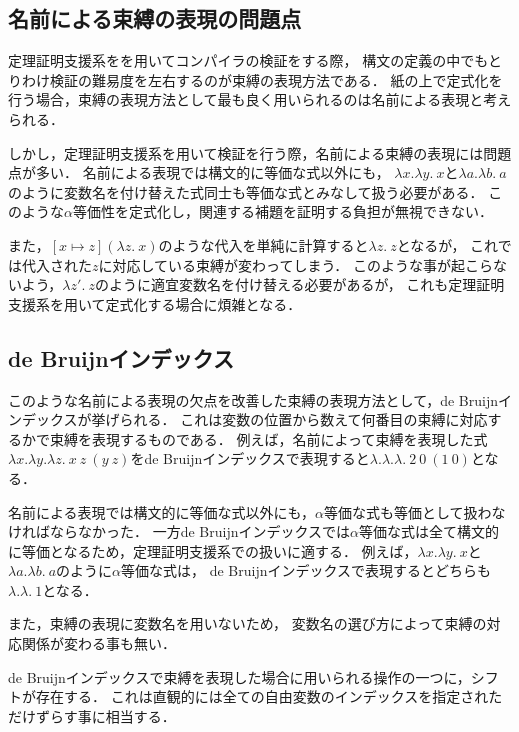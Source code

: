 \documentclass[T]{compsoft}
\begin{document}
\subsection{名前による束縛の表現の問題点}
定理証明支援系をを用いてコンパイラの検証をする際，
構文の定義の中でもとりわけ検証の難易度を左右するのが束縛の表現方法である．
紙の上で定式化を行う場合，束縛の表現方法として最も良く用いられるのは名前による表現と考えられる．

しかし，定理証明支援系を用いて検証を行う際，名前による束縛の表現には問題点が多い．
名前による表現では構文的に等価な式以外にも，
$\lambda x.\lambda y.~x$と$\lambda a.\lambda b.~a$のように変数名を付け替えた式同士も等価な式とみなして扱う必要がある．
このような$\alpha$等価性を定式化し，関連する補題を証明する負担が無視できない．

また，$[x \mapsto z](\lambda z.~x)$のような代入を単純に計算すると$\lambda z.~z$となるが，
これでは代入された$z$に対応している束縛が変わってしまう．
このような事が起こらないよう，$\lambda z'.~z$のように適宜変数名を付け替える必要があるが，
これも定理証明支援系を用いて定式化する場合に煩雑となる．

\subsection{de Bruijnインデックス}
このような名前による表現の欠点を改善した束縛の表現方法として，de Bruijnインデックス\cite{Pierce:TypeSystems}が挙げられる．
これは変数の位置から数えて何番目の束縛に対応するかで束縛を表現するものである．
例えば，名前によって束縛を表現した式$\lambda x. \lambda y. \lambda z.~x~z~(y~z)$をde Bruijnインデックスで表現すると$\lambda. \lambda. \lambda.~2~0~(1~0)$となる．

名前による表現では構文的に等価な式以外にも，$\alpha$等価な式も等価として扱わなければならなかった．
一方de Bruijnインデックスでは$\alpha$等価な式は全て構文的に等価となるため，定理証明支援系での扱いに適する．
例えば，$\lambda x.\lambda y.~x$と$\lambda a.\lambda b.~a$のように$\alpha$等価な式は，
de Bruijnインデックスで表現するとどちらも$\lambda.\lambda.~1$となる．

また，束縛の表現に変数名を用いないため，
変数名の選び方によって束縛の対応関係が変わる事も無い．

de Bruijnインデックスで束縛を表現した場合に用いられる操作の一つに，シフトが存在する．
これは直観的には全ての自由変数のインデックスを指定されただけずらす事に相当する．
\end{document}
